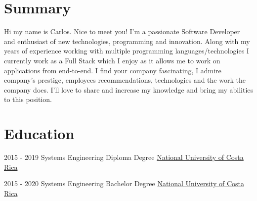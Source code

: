 \documentclass[letterpaper]{twentysecondcv} %
\begin{document}
\makeprofile
\section{Summary}
\small{Hi my name is Carlos. Nice to meet you! I'm a passionate Software Developer and enthusiast of new technologies, programming and innovation. Along with my years of experience working with multiple programming languages/technologies I currently work as a Full Stack which I enjoy as it allows me to work on applications from end-to-end. I find your company fascinating, I admire company's prestige, employees recommendations, technologies and the work the company does. I'll love to share and increase my knowledge and bring my abilities to this position.

}

\section{Education}

\begin{twenty}
	\twentyitem
    	{2015 - 2019}
        {Systems Engineering Diploma Degree}
        {\href{https://www.una.ac.cr/}{National University of Costa Rica}}
        {}
      
	\twentyitem
    	{2015 - 2020}
        {Systems Engineering Bachelor Degree}
        {\href{https://www.una.ac.cr/}{National University of Costa Rica}}
        {}

\end{twenty}
\end{document}
